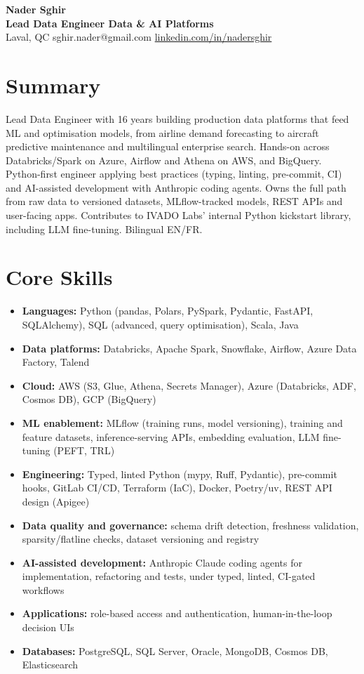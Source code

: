 \documentclass[10pt,letterpaper]{article}
\begin{document}
\begin{center}
{\LARGE\bfseries Nader Sghir}\\[3pt]
{\large\color{accent}\bfseries Lead Data Engineer \textbar{} Data \& AI Platforms}\\[3pt]
Laval, QC \textperiodcentered{} sghir.nader@gmail.com \textperiodcentered{} \href{https://linkedin.com/in/nadersghir}{linkedin.com/in/nadersghir}
\end{center}

\section*{Summary}
Lead Data Engineer with 16 years building production data platforms that feed ML and optimisation models, from airline demand forecasting to aircraft predictive maintenance and multilingual enterprise search. Hands-on across Databricks/Spark on Azure, Airflow and Athena on AWS, and BigQuery. Python-first engineer applying best practices (typing, linting, pre-commit, CI) and AI-assisted development with Anthropic coding agents. Owns the full path from raw data to versioned datasets, MLflow-tracked models, REST APIs and user-facing apps. Contributes to IVADO Labs' internal Python kickstart library, including LLM fine-tuning. Bilingual EN/FR.

\section*{Core Skills}
\begin{itemize}
\item \textbf{Languages:} Python (pandas, Polars, PySpark, Pydantic, FastAPI, SQLAlchemy), SQL (advanced, query optimisation), Scala, Java
\item \textbf{Data platforms:} Databricks, Apache Spark, Snowflake, Airflow, Azure Data Factory, Talend
\item \textbf{Cloud:} AWS (S3, Glue, Athena, Secrets Manager), Azure (Databricks, ADF, Cosmos DB), GCP (BigQuery)
\item \textbf{ML enablement:} MLflow (training runs, model versioning), training and feature datasets, inference-serving APIs, embedding evaluation, LLM fine-tuning (PEFT, TRL)
\item \textbf{Engineering:} Typed, linted Python (mypy, Ruff, Pydantic), pre-commit hooks, GitLab CI/CD, Terraform (IaC), Docker, Poetry/uv, REST API design (Apigee)
\item \textbf{Data quality and governance:} schema drift detection, freshness validation, sparsity/flatline checks, dataset versioning and registry
\item \textbf{AI-assisted development:} Anthropic Claude coding agents for implementation, refactoring and tests, under typed, linted, CI-gated workflows
\item \textbf{Applications:} role-based access and authentication, human-in-the-loop decision UIs
\item \textbf{Databases:} PostgreSQL, SQL Server, Oracle, MongoDB, Cosmos DB, Elasticsearch
\end{itemize}
\end{document}
